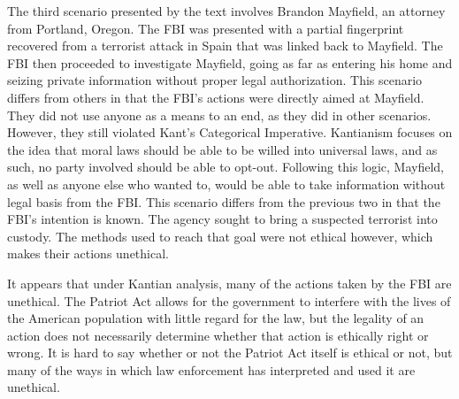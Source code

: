 \documentclass{paper}
\begin{document}
\begin{linenumbers}
The third scenario presented by the text involves Brandon Mayfield, an attorney from Portland, Oregon. The FBI was presented with a partial fingerprint recovered from a terrorist attack in Spain that was linked back to Mayfield. The FBI then proceeded to investigate Mayfield, going as far as entering his home and seizing private information without proper legal authorization. This scenario differs from others in that the FBI's actions were directly aimed at Mayfield. They did not use anyone as a means to an end, as they did in other scenarios. However, they still violated Kant's Categorical Imperative. Kantianism focuses on the idea that moral laws should be able to be willed into universal laws, and as such, no party involved should be able to opt-out. Following this logic, Mayfield, as well as anyone else who wanted to, would be able to take information without legal basis from the FBI. This scenario differs from the previous two in that the FBI's intention is known. The agency sought to bring a suspected terrorist into custody. The methods used to reach that goal were not ethical however, which makes their actions unethical.

It appears that under Kantian analysis, many of the actions taken by the FBI are unethical. The Patriot Act allows for the government to interfere with the lives of the American population with little regard for the law, but the legality of an action does not necessarily determine whether that action is ethically right or wrong.  It is hard to say whether or not the Patriot Act itself is ethical or not, but many of the ways in which law enforcement has interpreted and used it are unethical. 
\end{linenumbers}
\newpage
\nocite{*}
\printbibliography
\end{document}

